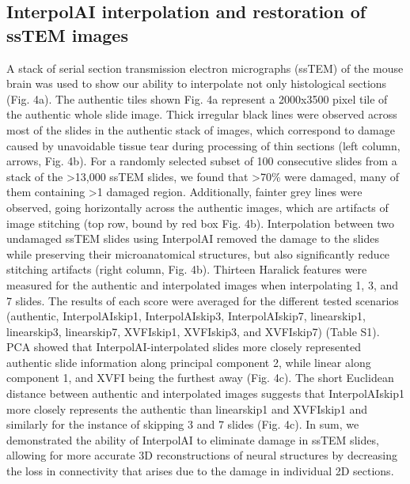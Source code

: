 \begin{refsection}
    
    \section{InterpolAI interpolation and restoration of ssTEM images}
    A stack of serial section transmission electron micrographs (ssTEM) of the mouse brain was used to show our ability to interpolate not only histological sections (Fig. 4a). The authentic tiles shown Fig. 4a represent a 2000x3500 pixel tile of the authentic whole slide image. Thick irregular black lines were observed across most of the slides in the authentic stack of images, which correspond to damage caused by unavoidable tissue tear during processing of thin sections (left column, arrows, Fig. 4b). For a randomly selected subset of 100 consecutive slides from a stack of the >13,000 ssTEM slides, we found that >70\% were damaged, many of them containing >1 damaged region. Additionally, fainter grey lines were observed, going horizontally across the authentic images, which are artifacts of image stitching (top row, bound by red box Fig. 4b). 
    Interpolation between two undamaged ssTEM slides using InterpolAI removed the damage to the slides while preserving their microanatomical structures, but also significantly reduce stitching artifacts (right column, Fig. 4b).
    Thirteen Haralick features were measured for the authentic and interpolated images when interpolating 1, 3, and 7 slides. The results of each score were averaged for the different tested scenarios (authentic, InterpolAIskip1, InterpolAIskip3, InterpolAIskip7, linearskip1, linearskip3, linearskip7, XVFIskip1, XVFIskip3, and XVFIskip7) (Table S1). PCA showed that InterpolAI-interpolated slides more closely represented authentic slide information along principal component 2, while linear along component 1, and XVFI being the furthest away (Fig. 4c). The short Euclidean distance between authentic and interpolated images suggests that InterpolAIskip1 more closely represents the authentic than linearskip1 and XVFIskip1 and similarly for the instance of skipping 3 and 7 slides (Fig. 4c).
    In sum, we demonstrated the ability of InterpolAI to eliminate damage in ssTEM slides, allowing for more accurate 3D reconstructions of neural structures by decreasing the loss in connectivity that arises due to the damage in individual 2D sections.


\end{refsection}
